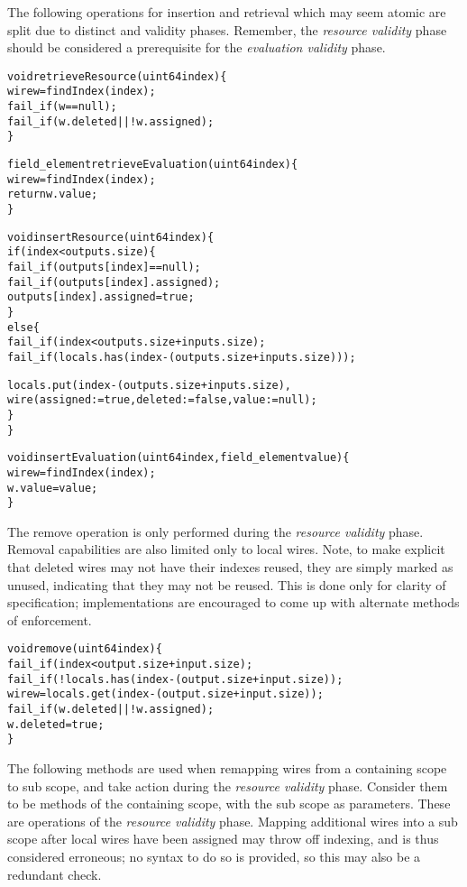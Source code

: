 The following operations for insertion and retrieval which may seem atomic are split due to distinct  and  validity phases.
Remember, the \textit{resource validity} phase should be considered a prerequisite for the \textit{evaluation validity} phase.

\begin{alltt}\ttSem
  void retrieveResource(uint64 index) \{
    wire w = findIndex(index);
    fail_if(w == null);
    fail_if(w.deleted || !w.assigned);
  \}

  field_element retrieveEvaluation(uint64 index) \{
    wire w = findIndex(index);
    return w.value;
  \}
  
  void insertResource(uint64 index) \{
    if(index < outputs.size) \{
      fail_if(outputs[index] == null);
      fail_if(outputs[index].assigned);
      outputs[index].assigned = true;
    \}
    else \{
      fail_if(index < outputs.size + inputs.size);
      fail_if(locals.has(index - (outputs.size + inputs.size)));
      
      locals.put(index - (outputs.size + inputs.size),
        wire(assigned := true, deleted := false, value := null);
    \}
  \}

  void insertEvaluation(uint64 index, field_element value) \{
    wire w = findIndex(index);
    w.value = value;
  \}
\end{alltt}

The remove operation is only performed during the \textit{resource validity} phase.
Removal capabilities are also limited only to local wires.
Note, to make explicit that deleted wires may not have their indexes reused, they are simply marked as unused, indicating that they may not be reused.
This is done only for clarity of specification; implementations are encouraged to come up with alternate methods of enforcement.

\begin{alltt}\ttSem
  void remove(uint64 index) \{
    fail_if(index < output.size + input.size);
    fail_if(!locals.has(index - (output.size + input.size));
    wire w = locals.get(index - (output.size + input.size));
    fail_if(w.deleted || !w.assigned);
    w.deleted = true;
  \}
\end{alltt}

The following methods are used when remapping wires from a containing scope to sub scope, and take action during the \textit{resource validity} phase.
Consider them to be methods of the containing scope, with the sub scope as parameters.
These are operations of the \textit{resource validity} phase.
Mapping additional wires into a sub scope after local wires have been assigned may throw off indexing, and is thus considered erroneous; no syntax to do so is provided, so this may also be a redundant check.

